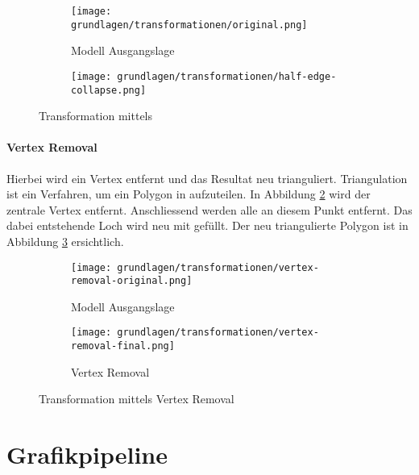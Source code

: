 \begin{figure}[H]
  \centering
  \begin{subfigure}{.5\textwidth}
    \centering
    \texttt{[image: grundlagen/transformationen/original.png]}
    \caption{Modell Ausgangslage}
  \end{subfigure}%
  \begin{subfigure}{.5\textwidth}
    \centering
    \texttt{[image: grundlagen/transformationen/half-edge-collapse.png]}
    \caption{}
  \end{subfigure}
  \caption{Transformation mittels }
  \label{fig:transformationHalfedgeCollapse}
\end{figure}

\paragraph{Vertex Removal}
Hierbei wird ein Vertex entfernt und das Resultat neu trianguliert. Triangulation ist ein Verfahren, um ein Polygon in  aufzuteilen.
In Abbildung \ref{fig:transformationVertexRemovalOriginal} wird der zentrale Vertex entfernt. Anschliessend werden alle  an diesem Punkt entfernt. Das dabei entstehende Loch wird neu mit  gefüllt. Der neu triangulierte Polygon ist in Abbildung \ref{fig:transformationVertexRemovalFinal} ersichtlich.

\begin{figure}[H]
  \centering
  \begin{subfigure}{.5\textwidth}
    \centering
    \texttt{[image: grundlagen/transformationen/vertex-removal-original.png]}
    \caption{Modell Ausgangslage}
    \label{fig:transformationVertexRemovalOriginal}
  \end{subfigure}%
  \begin{subfigure}{.5\textwidth}
    \centering
    \texttt{[image: grundlagen/transformationen/vertex-removal-final.png]}
    \caption{Vertex Removal}
    \label{fig:transformationVertexRemovalFinal}
  \end{subfigure}
  \caption{Transformation mittels Vertex Removal}
  \label{fig:transformationVertexRemoval}
\end{figure}

\section{Grafikpipeline}

